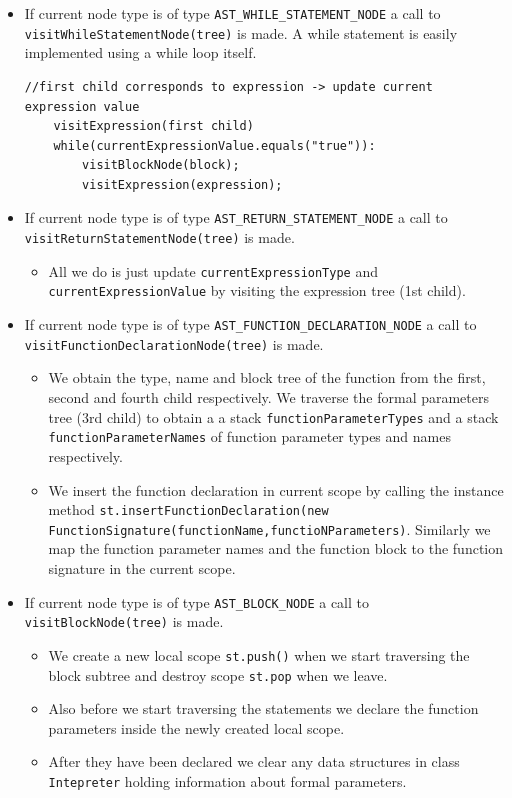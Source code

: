 \begin{itemize}
\item If current node type is of type \verb!AST_WHILE_STATEMENT_NODE! a call to \verb!visitWhileStatementNode(tree)! is made. A while statement is easily implemented using a while loop itself.
\begin{lstlisting}[caption=encoding of while loop]
    //first child corresponds to expression -> update current expression value
    visitExpression(first child)
    while(currentExpressionValue.equals("true")):
        visitBlockNode(block);
        visitExpression(expression);
\end{lstlisting}
 \item If current node type is of type \verb!AST_RETURN_STATEMENT_NODE! a call to \verb!visitReturnStatementNode(tree)! is made.
 \begin{itemize}
     \item All we do is just update \verb!currentExpressionType! and \verb!currentExpressionValue! by visiting the expression tree (1st child).
 \end{itemize}
      \item If current node type is of type \verb!AST_FUNCTION_DECLARATION_NODE! a call to \verb!visitFunctionDeclarationNode(tree)! is made.
    \begin{itemize}
        \item We obtain the type, name and block tree of the function from the first, second and fourth child respectively. We traverse the formal parameters tree (3rd child) to obtain a a stack \verb!functionParameterTypes! and a stack \verb!functionParameterNames! of function parameter types and names respectively.
        \item 
        We insert the function declaration in current scope by calling the instance method \verb!st.insertFunctionDeclaration(new!
        \verb!FunctionSignature(functionName,functioNParameters)!. Similarly we map the function parameter names and the function block to the function signature in the current scope.
    \end{itemize}
   \item If current node type is of type \verb!AST_BLOCK_NODE! a call to \verb!visitBlockNode(tree)! is made.
   \begin{itemize}
       \item We create a new local scope \verb!st.push()! when we start traversing the block subtree and destroy scope \verb!st.pop! when we leave.
       \item Also before we start traversing the statements we declare the function parameters inside the newly created local scope.
       \item After they have been declared we clear any data structures in class \verb!Intepreter! holding information about formal parameters.
   \end{itemize}
\end{itemize}

